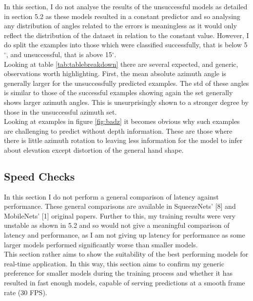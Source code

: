 \documentclass{article}
\begin{document}
In this section, I do not analyse the results of the unsuccessful models as detailed in section 5.2 as these models resulted in a constant predictor and so analysing any distribution of angles related to the errors is meaningless as it would only reflect the distribution of the dataset in relation to the constant value. However, I do split the examples into those which were classified successfully, that is below 5 $^{\circ}$, and unsuccessful, that is above 15$^{\circ}$. \\

Looking at table \ref{tab:tablebreakdown} there are several expected, and generic, observations worth highlighting. First, the mean absolute azimuth angle is generally larger for the unsuccessfully predicted examples. The std of these angles is similar to those of the successful examples showing again the set generally shows larger azimuth angles. 
This is unsurprisingly shown to a stronger degree by those in the unsuccessful azimuth set. \\

Looking at examples in figure \ref{fig:badz} it becomes obvious why such examples are challenging to predict without depth information. These are those where there is little azimuth rotation to leaving less information for the model to infer about elevation except distortion of the general hand shape. \\


\subsection{Speed Checks}
In this section I do not perform a general comparison of latency against performance. These general comparisons are available in SqueezeNets' [8] and MobileNets' [1] original papers. Further to this, my training results were very unstable as shown in 5.2 and so would not give a meaningful comparison of latency and performance, as I am not giving up latency for performance as some larger models performed significantly worse than smaller models. \\

This section rather aims to show the suitability of the best performing models for real-time application. In this way, this section aims to confirm my generic preference for smaller models during the training process and whether it has resulted in fast enough models, capable of serving predictions at a smooth frame rate (30 FPS).\\
\end{document}
